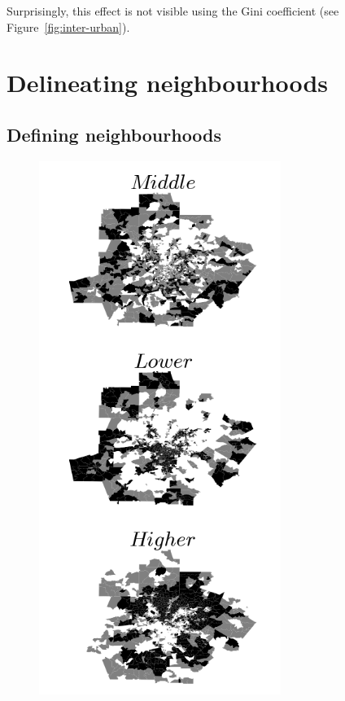 Surprisingly, this effect is not visible using the Gini coefficient (see
Figure~\ref{fig:inter-urban}).  


\section{Delineating neighbourhoods}
\label{sec:neighbourhoods}

\subsection{Defining neighbourhoods}
\label{sub:defining_neighbourhoods}

\begin{figure}
    \centering
    \includegraphics[width=0.7\textwidth]{./gfx/chapter-segregation/figure2.png}

\end{figure}
